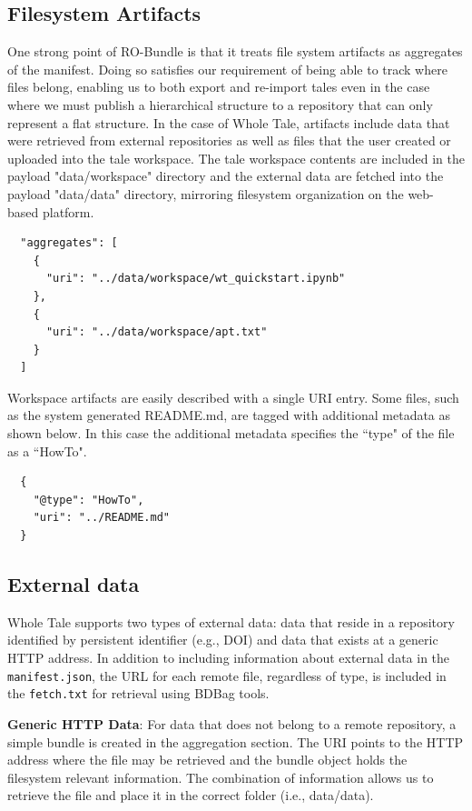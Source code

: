 \documentclass[conference]{IEEEtran}
\begin{document}
\subsection{Filesystem Artifacts}
One strong point of RO-Bundle is that it treats file system artifacts as aggregates of the 
manifest. Doing so satisfies our requirement of being able to track where files belong, enabling 
us to both export and re-import tales even in the case where we must publish a hierarchical 
structure to a repository that can only represent a flat structure. In the case of Whole Tale, 
artifacts include data that were retrieved from external repositories as well as files that the user created or uploaded into the tale workspace. The tale workspace contents are included in the payload "data/workspace" directory and the external data are fetched into the payload "data/data" directory, mirroring filesystem organization on the web-based platform.

\begin{lstlisting}
  "aggregates": [
    {
      "uri": "../data/workspace/wt_quickstart.ipynb"
    },
    {
      "uri": "../data/workspace/apt.txt"
    }
  ]
\end{lstlisting}

Workspace artifacts are easily described with a single URI entry. Some files, such as the 
system generated README.md, are tagged with additional metadata as shown below. In this case the 
additional metadata specifies the ``type" of the file as a ``HowTo".

\begin{lstlisting}
  {
    "@type": "HowTo",
    "uri": "../README.md"
  }
\end{lstlisting}

\subsection{External data}

Whole Tale supports two types of external data: data that reside in a repository identified by persistent identifier (e.g., DOI) and data that exists at a generic HTTP address. In addition to 
including information about external data in the \texttt{manifest.json}, the URL for each remote file, regardless of type, is included in the \texttt{fetch.txt} for retrieval using BDBag tools.

{\bf Generic HTTP Data}:
For data that does not belong to a remote repository, a simple bundle is created in the aggregation section. The URI points to the HTTP address where the file may be retrieved and the bundle object holds the filesystem relevant information. The combination of information allows us to retrieve the file and place it in the correct folder (i.e., data/data).
\end{document}
